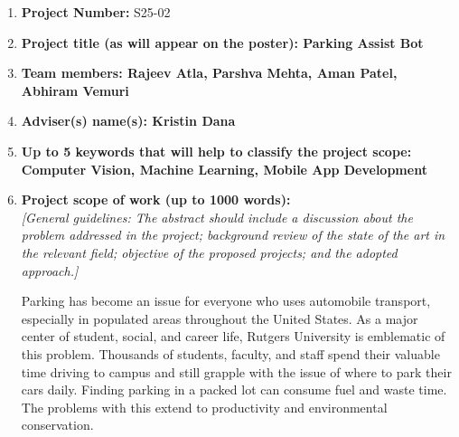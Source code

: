 \documentclass{article}
\begin{document}
\vspace{2em}
\begin{enumerate}[leftmargin=1.5cm]
    \item \textbf{\large Project Number:} S25-02\\
    
    \vspace{1em}

    \item \textbf{\large  Project title (as will appear on the poster): Parking Assist Bot} \\
    
    \vspace{1em}

    \item \textbf{\large Team members: Rajeev Atla, Parshva Mehta, Aman Patel, Abhiram Vemuri} \\
    
    \vspace{1em}

    \item \textbf{\large Adviser(s) name(s): Kristin Dana} \\
    
    \vspace{1em}

    \item \textbf{\large Up to 5 keywords that will help to classify the project scope: Computer Vision, Machine Learning, Mobile App Development} \\
    
    \vspace{1em}

    \item \textbf{\large Project scope of work (up to 1000 words):} \\
    \textit{[General guidelines: The abstract should include a discussion about the problem addressed in the project; background review of the state of the art in the relevant field; objective of the proposed projects; and the adopted approach.]}
    
    Parking has become an issue for everyone who uses automobile transport, 
    especially in populated areas throughout the United States. 
    As a major center of student, 
    social, 
    and career life, 
    Rutgers University is emblematic of this problem. 
    Thousands of students, 
    faculty, 
    and staff spend their valuable time driving to campus and still grapple with the issue of where to park their cars daily. 
    Finding parking in a packed lot can consume fuel and waste time. 
    The problems with this extend to productivity and environmental conservation.


\end{enumerate}
\end{document}
